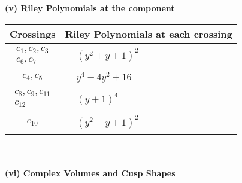 \documentclass[1p]{elsarticle_modified}
\theoremstyle{definition}
\begin{document}
\newpage\renewcommand{\arraystretch}{1}
\flushleft \textbf{(v) Riley Polynomials at the component}\newline \\
\begin{tabular}{m{50pt}|m{274pt}}
Crossings & \hspace{64pt}Riley Polynomials at each crossing \\
\hline $$\begin{aligned}c_{1},c_{2},c_{3}\\c_{6},c_{7}\end{aligned}$$&$\begin{aligned}
&(y^2+y+1)^2
\end{aligned}$\\
\hline $$\begin{aligned}c_{4},c_{5}\end{aligned}$$&$\begin{aligned}
&y^4-4 y^2+16
\end{aligned}$\\
\hline $$\begin{aligned}c_{8},c_{9},c_{11}\\c_{12}\end{aligned}$$&$\begin{aligned}
&(y+1)^4
\end{aligned}$\\
\hline $$\begin{aligned}c_{10}\end{aligned}$$&$\begin{aligned}
&(y^2- y+1)^2
\end{aligned}$\\
\hline
\end{tabular}\\~\\
\newpage\flushleft \textbf{(vi) Complex Volumes and Cusp Shapes}
\end{document}
